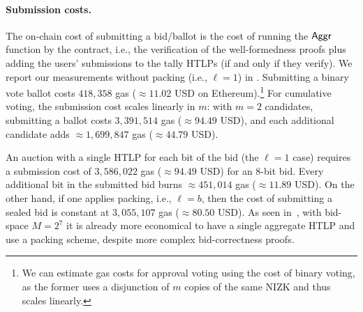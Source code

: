 

\paragraph{Submission costs.} 
The on-chain cost of submitting a bid/ballot is the cost of running the $\sf Aggr$ function by the contract, i.e., the verification of the well-formedness proofs plus adding the users' submissions to the tally HTLPs (if and only if they verify). We report our measurements without packing (i.e., $\ell=1$) in . Submitting a binary vote ballot costs $418,358$ gas ($\approx 11.02$ USD on Ethereum).\footnote{We can estimate gas costs for approval voting using the cost of binary voting, as the former uses a disjunction of $m$ copies of the same NIZK and thus scales linearly.
} 
For cumulative voting, the submission cost scales linearly in $m$: with $m=2$ candidates, submitting a ballot costs 
$3,391,514$ gas ($\approx94.49$ USD), 
and each additional candidate adds $\approx 1,699,847$ gas ($\approx 44.79$ USD).

An auction with a single HTLP for each bit of the bid (the $\ell=1$ case) requires a submission cost of $3,586,022$ gas ($\approx94.49$ USD) for an $8$-bit bid. Every additional bit in the submitted bid burns $\approx451,014$ gas ($\approx 11.89$ USD). 
On the other hand, if one applies packing, i.e., $\ell=b$, then the cost of submitting a sealed bid is constant at $3,055,107$ gas ($\approx80.50$ USD). As seen in~, with bid-space $M=2^7$ it is already more economical to have a single aggregate HTLP and use a packing scheme, despite more complex bid-correctness proofs.


